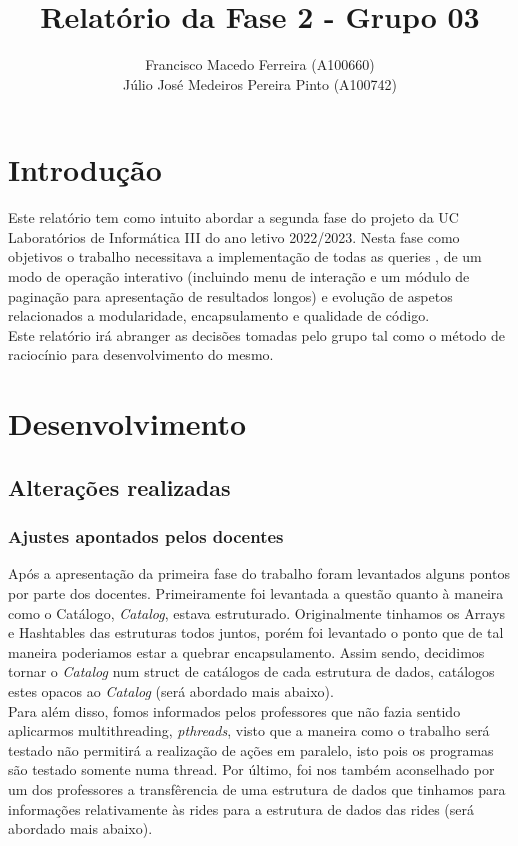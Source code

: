 \documentclass{article}
\title{Relatório da Fase 2 - Grupo 03}
\author{Francisco Macedo Ferreira (A100660)\\Júlio José Medeiros Pereira Pinto (A100742)}
\begin{document}
  
    \maketitle
    
    \section{Introdução}
    Este relatório tem como intuito abordar a segunda fase do projeto da UC Laboratórios 
    de Informática III do ano letivo 2022/2023.
    Nesta fase como objetivos o trabalho necessitava a implementação de todas as queries
    , de um modo de operação interativo (incluindo menu de interação e um módulo de 
    paginação para apresentação de resultados longos) e evolução de aspetos relacionados
    a modularidade, encapsulamento e qualidade de código. \\
    
    Este relatório irá abranger as decisões tomadas pelo grupo tal como o método de 
    raciocínio para desenvolvimento do mesmo.
    
    \section{Desenvolvimento}
    
    \subsection{Alterações realizadas}
        \subsubsection{Ajustes apontados pelos docentes}
            Após a apresentação da primeira fase do trabalho foram levantados
            alguns pontos por parte dos docentes. Primeiramente foi levantada
            a questão quanto à maneira como o Catálogo, \emph{Catalog}, estava
            estruturado. Originalmente tinhamos os Arrays e Hashtables das 
            estruturas todos juntos, porém foi levantado o ponto que de tal 
            maneira poderiamos estar a quebrar encapsulamento. Assim sendo, 
            decidimos tornar o \emph{Catalog} num struct de catálogos de cada 
            estrutura de dados, catálogos estes opacos ao \emph{Catalog} 
            (será abordado mais abaixo).\\Para além disso, fomos informados 
            pelos professores que não fazia sentido aplicarmos multithreading, 
            \emph{pthreads}, visto que a maneira como o trabalho será testado 
            não permitirá a realização de ações em paralelo, isto pois os 
            programas são testado somente numa thread. Por último, foi nos 
            também aconselhado por um dos professores a transfêrencia de 
            uma estrutura de dados que tinhamos para informações relativamente 
            às rides para a estrutura de dados das rides (será abordado mais 
            abaixo).
\end{document}
